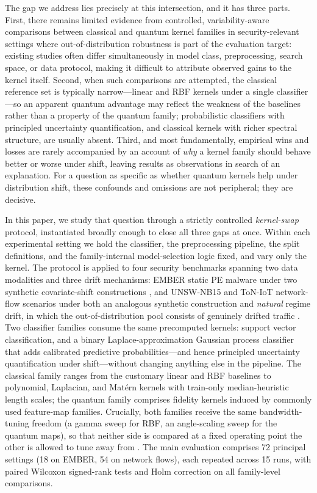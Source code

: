 \documentclass[journal]{IEEEtran}
\begin{document}
The gap we address lies precisely at this intersection, and it has three parts. First, there remains limited evidence from controlled, variability-aware comparisons between classical and quantum kernel families in security-relevant settings where out-of-distribution robustness is part of the evaluation target: existing studies often differ simultaneously in model class, preprocessing, search space, or data protocol, making it difficult to attribute observed gains to the kernel itself. Second, when such comparisons are attempted, the classical reference set is typically narrow---linear and RBF kernels under a single classifier---so an apparent quantum advantage may reflect the weakness of the baselines rather than a property of the quantum family; probabilistic classifiers with principled uncertainty quantification, and classical kernels with richer spectral structure, are usually absent. Third, and most fundamentally, empirical wins and losses are rarely accompanied by an account of \emph{why} a kernel family should behave better or worse under shift, leaving results as observations in search of an explanation. For a question as specific as whether quantum kernels help under distribution shift, these confounds and omissions are not peripheral; they are decisive.

In this paper, we study that question through a strictly controlled \emph{kernel-swap} protocol, instantiated broadly enough to close all three gaps at once. Within each experimental setting we hold the classifier, the preprocessing pipeline, the split definitions, and the family-internal model-selection logic fixed, and vary only the kernel. The protocol is applied to four security benchmarks spanning two data modalities and three drift mechanisms: EMBER static PE malware under two synthetic covariate-shift constructions \cite{anderson2018ember}, and UNSW-NB15 and ToN-IoT network-flow scenarios under both an analogous synthetic construction and \emph{natural} regime drift, in which the out-of-distribution pool consists of genuinely drifted traffic \cite{moustafa2015unsw,alsaedi2020toniot}. Two classifier families consume the same precomputed kernels: support vector classification, and a binary Laplace-approximation Gaussian process classifier \cite{rasmussen2006gpml} that adds calibrated predictive probabilities---and hence principled uncertainty quantification under shift---without changing anything else in the pipeline. The classical family ranges from the customary linear and RBF baselines to polynomial, Laplacian, and Mat\'ern kernels with train-only median-heuristic length scales; the quantum family comprises fidelity kernels induced by commonly used feature-map families. Crucially, both families receive the same bandwidth-tuning freedom (a gamma sweep for RBF, an angle-scaling sweep for the quantum maps), so that neither side is compared at a fixed operating point the other is allowed to tune away from \cite{shaydulin2022bandwidth,canatar2023bandwidth}. The main evaluation comprises 72 principal settings (18 on EMBER, 54 on network flows), each repeated across 15 runs, with paired Wilcoxon signed-rank tests and Holm correction on all family-level comparisons.
\end{document}
